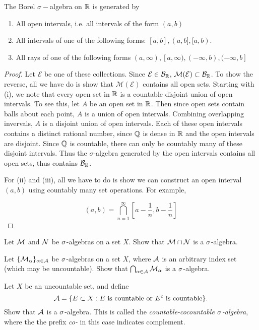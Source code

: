 \documentclass[main.tex]{subfiles}
\begin{document}
\begin{proposition}The Borel $\sigma-$algebra on ${\mathbb R}$ is generated by 
\begin{enumerate}
	\item All open intervals, i.e. all intervals of the form $(a, b)$
	\item All intervals of one of the following forms: $[a, b], (a, b], [a, b)$.
	\item All rays of one of the following forms $(a, \infty), [a, \infty), (-\infty, b), (-\infty, b]$
\end{enumerate}
\begin{proof}
Let $\mathcal{E}$ be one of these collections. Since $\mathcal{E} \in \mathcal{B}_{\mathbb R}$, $\mathcal{M}(\mathcal{E}) \subset \mathcal{B}_{\mathbb R}$. To show the reverse, all we have do is show that $\mathcal{M}(\mathcal{E})$ contains all open sets. Starting with (i), we note that every open set in ${\mathbb R}$ is a countable disjoint union of open intervals. To see this, let $A$ be an open set in ${\mathbb R}$. Then since open sets contain balls about each point, $A$ is a union of open intervals. Combining overlapping invervals, $A$ is a disjoint union of open intervals. Each of these open intervals contains a distinct rational number, since $\mathbb{Q}$ is dense in ${\mathbb R}$ and the open intervals are disjoint. Since $\mathbb{Q}$ is countable, there can only be countably many of these disjoint intervals. Thus the $\sigma$-algebra generated by the open intervals contains all open sets, thus contains $\mathcal{B}_{\mathbb R}$.

For (ii) and (iii), all we have to do is show we can construct an open interval $(a, b)$ using countably many set operations. For example,

\[
(a, b) = \bigcap_{n=1}^\infty \left[ a - \frac{1}{n}, b - \frac{1}{n}  \right]
\]

\end{proof}
\end{proposition}

\begin{exercises}
\item Let ${\mathcal M}$ and ${\mathcal N}$ be ${\sigma}$-algebras on a set $X$. Show that ${\mathcal M} \cap {\mathcal N}$ is a ${\sigma}$-algebra.
\item Let $\{{\mathcal M}_\alpha\}_{\alpha\in {\mathcal A}}$ be ${\sigma}$-algebras on a set $X$, where ${\mathcal A}$ is an arbitrary index set (which may be uncountable). Show that $\bigcap_{\alpha\in {\mathcal A}}{\mathcal M}_\alpha$ is a ${\sigma}$-algebra.
\item Let $X$ be an uncountable set, and define
\[
{\mathcal A} = \{ E \subset X : E \text{ is countable or } E^c \text{ is countable} \}.
\]
Show that ${\mathcal A}$ is a ${\sigma}$-algebra. This is called the \emph{countable-cocountable ${\sigma}$-algebra}, where the the prefix \emph{co-} in this case indicates complement.
\end{exercises}
\end{document}
